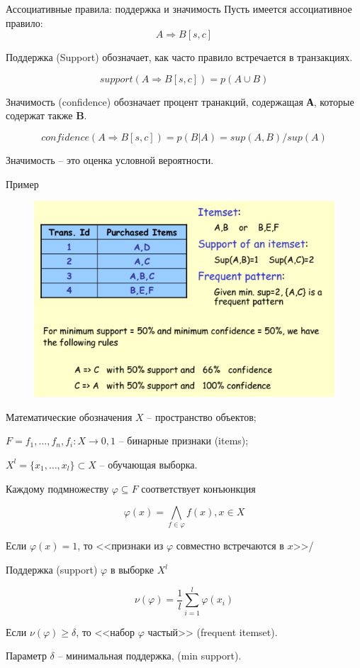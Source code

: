 \documentclass{beamer}
\begin{document}
\begin{frame}[t]{Ассоциативные правила: поддержка и значимость}
	Пусть имеется ассоциативное правило:
	\[A \Rightarrow B [ s, c ]\]

	\begin{block}{Поддержка (Support)}
		обозначает, как часто правило встречается в транзакциях. 
		
		\[support(A \Rightarrow B [ s, c ]) = p(A \cup B)\]
	\end{block}		

	\begin{block}{Значимость (confidence)}
		обозначает процент транакций, содержащая \textbf{А}, которые содержат также \textbf{B}. 		
		
		\[confidence(A \Rightarrow B [ s, c ]) = p(B|A) = sup(A,B)/sup(A)\]
	\end{block}	
	
	Значимость -- это оценка условной вероятности.	
\end{frame}

\begin{frame}{Пример}
	\begin{figure}[h]
		\centering
		\includegraphics[scale=0.75]{images/lec08-pic04.png}
	\end{figure}
\end{frame}

\begin{frame}{Математические обозначения}
	$X$ -- пространство объектов;

	$F = {f_1, \ldots, f_n}, f_i: X \rightarrow {0, 1}$ -- бинарные признаки (items);

	$X^l=\{x_1, \ldots, x_l\} \subset X$ -- обучающая выборка.

	Каждому подмножеству $\varphi \subseteq F$ соответствует конъюнкция

	\[\varphi(x)=\bigwedge \limits_{f\in \varphi} f(x), x \in X\]

	Если $\varphi(x)=1$, то <<признаки из $\varphi$ совместно встречаются в $x$>>/

	Поддержка (support) $\varphi$ в выборке $X^l$

	\[\nu(\varphi)=\frac{1}{l}\sum_{i=1}^{l}\varphi(x_i)\]

	Если $\nu(\varphi)\geq \delta$, то <<набор $\varphi$ частый>> (frequent itemset).

	Параметр $\delta$ -- минимальная поддержка, (min support).
\end{frame}
\end{document}
